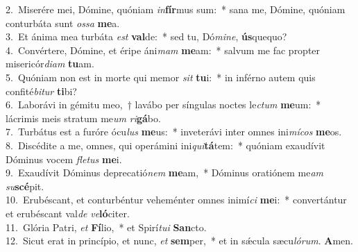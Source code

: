 {2.~}Miserére mei, Dómine, quóniam \textit{in}\textbf{fír}mus sum:~* sana me, Dómine, quóniam conturbáta sunt \textit{os}\textit{sa} \textbf{me}a.\\
{3.~}Et ánima mea turbáta \textit{est} \textbf{val}de:~* sed tu, Dó\textit{mi}\textit{ne}, \textbf{ús}quequo?\\
{4.~}Convértere, Dómine, et éripe áni\textit{mam} \textbf{me}am:~* salvum me fac propter misericór\textit{di}\textit{am} \textbf{tu}am.\\
{5.~}Quóniam non est in morte qui memor \textit{sit} \textbf{tu}i:~* in inférno autem quis confité\textit{bi}\textit{tur} \textbf{ti}bi?\\
{6.~}Laborávi in gémitu meo,~† lavábo per síngulas noctes le\textit{ctum} \textbf{me}um:~* lácrimis meis stratum me\textit{um} \textit{ri}\textbf{gá}bo.\\
{7.~}Turbátus est a furóre ócu\textit{lus} \textbf{me}us:~* inveterávi inter omnes ini\textit{mí}\textit{cos} \textbf{me}os.\\
{8.~}Discédite a me, omnes, qui operámini ini\textit{qui}\textbf{tá}tem:~* quóniam exaudívit Dóminus vocem \textit{fle}\textit{tus} \textbf{me}i.\\
{9.~}Exaudívit Dóminus deprecatió\textit{nem} \textbf{me}am,~* Dóminus oratiónem me\textit{am} \textit{su}\textbf{scé}pit.\\
{10.~}Erubéscant, et conturbéntur veheménter omnes inimí\textit{ci} \textbf{me}i:~* convertántur et erubéscant val\textit{de} \textit{ve}\textbf{ló}citer.\\
{11.~}Glória Patri, \textit{et} \textbf{Fí}lio,~* et Spirí\textit{tu}\textit{i} \textbf{San}cto.\\
{12.~}Sicut erat in princípio, et nunc, \textit{et} \textbf{sem}per,~* et in sǽcula sæcu\textit{ló}\textit{rum}. \textbf{A}men.\\
